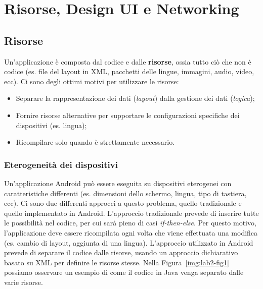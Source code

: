 \newcommand{\myparagraph}[1]{\paragraph{#1}\mbox{}\\}

\chapter{Risorse, Design UI e Networking}

\section{Risorse}

Un'applicazione è composta dal codice e dalle \textbf{risorse}, ossia tutto ciò
che non è codice (es. file del layout in XML, pacchetti delle lingue, immagini,
audio, video, ecc).
Ci sono degli ottimi motivi per utilizzare le risorse:

\begin{itemize}
\item Separare la rappresentazione dei dati (\textit{layout}) dalla gestione dei
dati (\textit{logica});
\item Fornire risorse alternative per supportare le configurazioni specifiche
dei dispositivi (es. lingua);
\item Ricompilare solo quando è strettamente necessario.
\end{itemize}

\subsection{Eterogeneità dei dispositivi}

Un'applicazione Android può essere eseguita su dispositivi eterogenei con
caratteristiche differenti (es. dimensioni dello schermo, lingua, tipo di
tastiera, ecc). Ci sono due differenti approcci a questo problema, quello
tradizionale e quello implementato in Android.
L'approccio tradizionale prevede di inserire tutte le possibilità nel codice,
per cui sarà pieno di casi \emph{if-then-else}. Per questo motivo,
l'applicazione deve essere ricompilata ogni volta che viene effettuata una
modifica (es. cambio di layout, aggiunta di una lingua).
L'approccio utilizzato in Android prevede di separare il codice dalle risorse,
usando un approccio dichiarativo basato su XML per definire le risorse stesse.
Nella Figura~\ref{img:lab2-fig1} possiamo osservare un esempio di come il codice
in Java venga separato dalle varie risorse.

